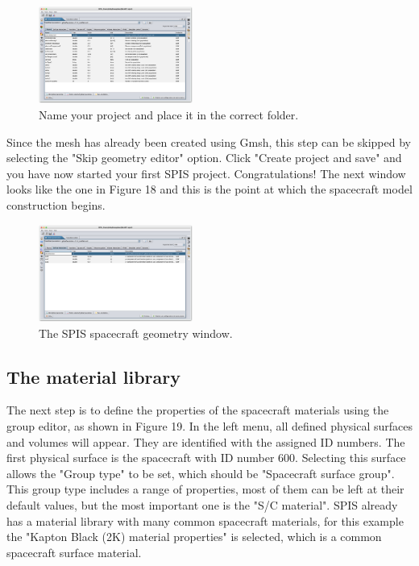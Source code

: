 \documentclass[a4paper, 11pt]{article}
\begin{document}
\begin{figure}[!ht]
    \centering
    \includegraphics[width=0.45\textwidth]{fig17.jpg}
    \caption{Name your project and place it in the correct folder.}
\end{figure}

Since the mesh has already been created using Gmsh, this step can be skipped by selecting the "Skip geometry editor" option. Click "Create project and save" and you have now started your first SPIS project. Congratulations! The next window looks like the one in Figure 18 and this is the point at which the spacecraft model construction begins.

\begin{figure}[!ht]
    \centering
    \includegraphics[width=0.45\textwidth]{fig18.jpg}
    \caption{The SPIS spacecraft geometry window.}
\end{figure}

\subsection{The material library} %

The next step is to define the properties of the spacecraft materials using the group editor, as shown in Figure 19. In the left menu, all defined physical surfaces and volumes will appear. They are identified with the assigned ID numbers. The first physical surface is the spacecraft with ID number 600. Selecting this surface allows the "Group type" to be set, which should be "Spacecraft surface group". This group type includes a range of properties, most of them can be left at their default values, but the most important one is the "S/C material". SPIS already has a material library with many common spacecraft materials, for this example the "Kapton Black (2K) material properties" is selected, which is a common spacecraft surface material.
\end{document}
